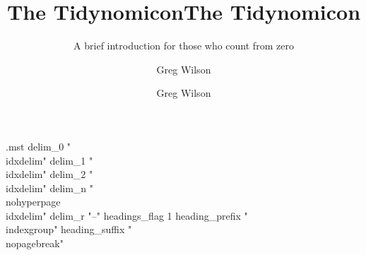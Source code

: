 \begin{filecontents*}{\jobname.mst}
delim_0 "\\idxdelim"
delim_1 "\\idxdelim"
delim_2 "\\idxdelim"
delim_n "\\nohyperpage{\\idxdelim}"
delim_r "--"
headings_flag 1
heading_prefix "\\indexgroup{{"
heading_suffix "}}\\nopagebreak\n"
\end{filecontents*}
\documentclass[cfonts]{nostarch}


\title{The Tidynomicon}
\author{Greg Wilson}
\date{}

\usepackage[italic]{mathastext}
\usepackage{enumitem}
\usepackage{nshyper}

\renewcommand{\descriptionlabel}[1]{\hspace{\labelsep}\textbf{#1 \quad}} %
\setcounter{secnumdepth}{0}

\renewcommand{\seename}{See}
\renewcommand{\alsoname}{See also}

\makeindex
\makeatletter
\def\idxdelim{\@ifnextchar{\hyperindexformat}{. }{, }}
\makeatother



\frontmatter
\author{Greg Wilson}
\title{The Tidynomicon}
\subtitle{A brief introduction for those who count from zero}
\makehalftitle
\maketitle




\brieftableofcontents
\tableofcontents

\mainmatter










\cleardoublepage

\appendix






\backmatter
\nocite{*}



\printindex





